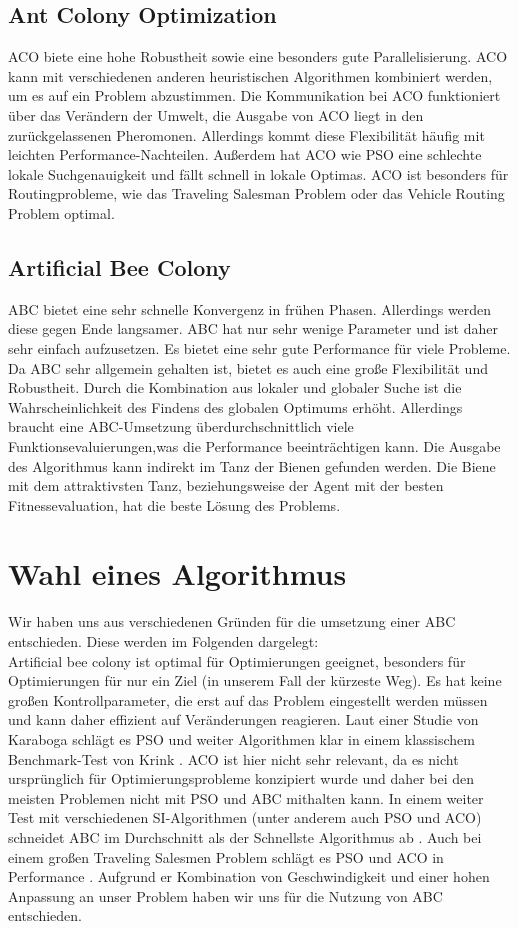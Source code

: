 \subsection{Ant Colony Optimization}
ACO biete eine hohe Robustheit sowie eine besonders gute Parallelisierung.  ACO kann mit verschiedenen anderen heuristischen Algorithmen kombiniert werden, um es auf ein Problem abzustimmen. Die Kommunikation bei ACO funktioniert über das Verändern der Umwelt, die Ausgabe von ACO liegt in den zurückgelassenen Pheromonen. Allerdings kommt diese Flexibilität häufig mit leichten Performance-Nachteilen. Außerdem hat ACO wie PSO eine schlechte lokale Suchgenauigkeit und fällt schnell in lokale Optimas. ACO ist besonders für Routingprobleme, wie das Traveling Salesman Problem \cite{stutzle1997max} oder das Vehicle Routing Problem \cite{gambardella1999macs} optimal.

\subsection{Artificial Bee Colony}
ABC bietet eine sehr schnelle Konvergenz in frühen Phasen. Allerdings werden diese gegen Ende langsamer.  ABC hat nur sehr wenige Parameter und ist daher sehr einfach aufzusetzen. Es bietet eine sehr gute Performance für viele Probleme. Da ABC sehr allgemein gehalten ist, bietet es auch eine große Flexibilität und Robustheit. Durch die Kombination aus lokaler und globaler Suche ist die Wahrscheinlichkeit des Findens des globalen Optimums erhöht. Allerdings braucht eine ABC-Umsetzung überdurchschnittlich viele Funktionsevaluierungen,was die Performance beeinträchtigen kann. Die Ausgabe des Algorithmus kann indirekt im Tanz der Bienen gefunden werden. Die Biene mit dem attraktivsten Tanz, beziehungsweise der Agent mit der besten Fitnessevaluation, hat die beste Lösung des Problems.

\section{Wahl eines Algorithmus}
Wir haben uns aus verschiedenen Gründen für die umsetzung einer ABC entschieden. Diese werden im Folgenden dargelegt:\\
 Artificial bee colony ist optimal für Optimierungen geeignet, besonders für Optimierungen für nur ein Ziel (in unserem Fall der kürzeste Weg). Es hat keine großen Kontrollparameter, die erst auf das Problem eingestellt werden müssen und kann daher effizient auf Veränderungen reagieren. Laut einer Studie von Karaboga \cite{karaboga2008performance} schlägt es PSO und weiter Algorithmen klar in einem klassischem Benchmark-Test von Krink \cite{krink2004noisy}. ACO ist hier nicht sehr relevant, da es nicht ursprünglich für Optimierungsprobleme konzipiert wurde und daher bei den meisten Problemen nicht mit PSO und ABC mithalten kann. In einem weiter Test mit verschiedenen SI-Algorithmen (unter anderem auch PSO und ACO) schneidet ABC im Durchschnitt als der Schnellste Algorithmus ab \cite{ab2015comprehensive}. Auch bei einem großen Traveling Salesmen Problem schlägt es PSO und ACO in Performance \cite{sabet2016comparison}.
Aufgrund er Kombination von Geschwindigkeit und einer hohen Anpassung an unser Problem haben wir uns für die Nutzung von ABC entschieden.
